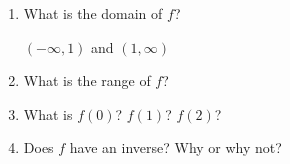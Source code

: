 \documentclass[handout,nooutcomes]{ximera}
\begin{document}
\begin{problem}
		\begin{enumerate}
		
			 \item What is the domain of $f$?
			 
			 \begin{freeResponse}
			 
			 $(-\infty, 1)$ and $(1, \infty)$
	
			\end{freeResponse}
			 
			 \item What is the range of $f$?
			 
			 \item What is $f(0)$?  $f(1)$?  $f(2)$?
			 
			 \item Does $f$ have an inverse?  Why or why not?
			
			\end{enumerate}
			
	\begin{freeResponse}
	
	\end{freeResponse}
			
	\end{problem}
	
\end{document}
